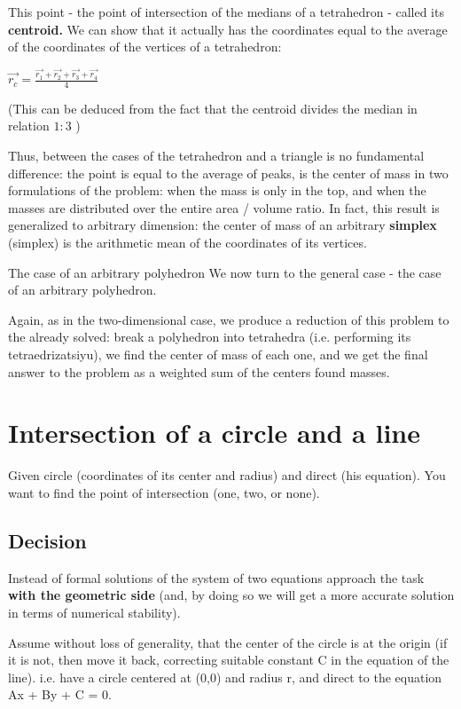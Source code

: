 This point - the point of intersection of the medians of a tetrahedron - called its \textbf{centroid.} We can show that it actually has the coordinates equal to the average of the coordinates of the vertices of a tetrahedron:

$\vec{r_{c}}=\frac{\vec{r_{1}}+\vec{r_{2}}+\vec{r_{3}}+\vec{r_{4}}}{4}$

(This can be deduced from the fact that the centroid divides the median in relation $1:3$ )

Thus, between the cases of the tetrahedron and a triangle is no fundamental difference: the point is equal to the average of peaks, is the center of mass in two formulations of the problem: when the mass is only in the top, and when the masses are distributed over the entire area / volume ratio. In fact, this result is generalized to arbitrary dimension: the center of mass of an arbitrary \textbf{simplex} (simplex) is the arithmetic mean of the coordinates of its vertices.

The case of an arbitrary polyhedron
We now turn to the general case - the case of an arbitrary polyhedron.

Again, as in the two-dimensional case, we produce a reduction of this problem to the already solved: break a polyhedron into tetrahedra (i.e. performing its tetraedrizatsiyu), we find the center of mass of each one, and we get the final answer to the problem as a weighted sum of the centers found masses.

\section{ Intersection of a circle and a line }
Given circle (coordinates of its center and radius) and direct (his equation). You want to find the point of intersection (one, two, or none).

\subsection{ Decision }
Instead of formal solutions of the system of two equations approach the task \textbf{with the geometric side} (and, by doing so we will get a more accurate solution in terms of numerical stability).

Assume without loss of generality, that the center of the circle is at the origin (if it is not, then move it back, correcting suitable constant C in the equation of the line). i.e. have a circle centered at (0,0) and radius r, and direct to the equation Ax + By + C = 0.


